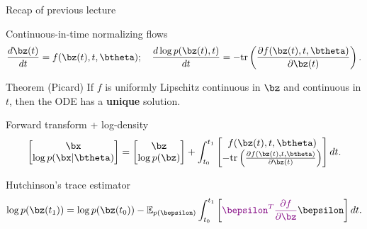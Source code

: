 \begin{frame}{Recap of previous lecture}
	\begin{block}{Continuous-in-time normalizing flows}
		\vspace{-0.5cm}
		\[
			\frac{d\bz(t)}{dt} = f(\bz(t), t, \btheta); \quad \frac{d \log p(\bz(t), t)}{d t} = - \text{tr} \left( \frac{\partial f (\bz(t), t, \btheta)}{\partial \bz(t)} \right).
		\]
		\vspace{-0.7cm}
	\end{block}
	\begin{block}{Theorem (Picard)}
		If $f$ is uniformly Lipschitz continuous in $\bz$ and continuous in $t$, then the ODE has a \textbf{unique} solution.
	\end{block}
	\begin{block}{Forward transform + log-density}
		\vspace{-0.4cm}
		\[
			\begin{bmatrix}
				\bx \\
				\log p(\bx | \btheta)
			\end{bmatrix}
			= 
			\begin{bmatrix}
				\bz \\
				\log p(\bz)
			\end{bmatrix} + 
			\int_{t_0}^{t_1} 
			\begin{bmatrix}
				f(\bz(t), t, \btheta) \\
				- \text{tr} \left( \frac{\partial f(\bz(t), t, \btheta)}{\partial \bz(t)} \right) 
			\end{bmatrix} dt.
		\]
		\vspace{-0.4cm}
	\end{block}	
	\begin{block}{Hutchinson's trace estimator}
		\vspace{-0.3cm}
		\[
		   \log p(\bz(t_1)) = \log p(\bz(t_0)) - \mathbb{E}_{p(\bepsilon)} \int_{t_0}^{t_1} \left[ {\color{violet}\bepsilon^T \frac{\partial f}{\partial \bz}} \bepsilon \right] dt.
		\]
	\end{block}
\end{frame}
